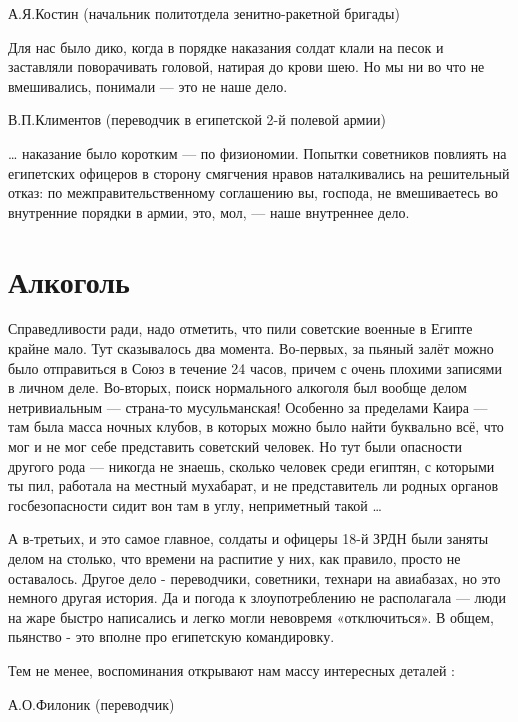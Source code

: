 А.Я.Костин (начальник политотдела зенитно-ракетной бригады)

\begin{textcitation}
	Для нас было дико, когда в порядке наказания солдат клали на песок и заставляли поворачивать головой, натирая до крови шею. Но мы ни во что не вмешивались, понимали — это не наше дело.
\end{textcitation}

В.П.Климентов (переводчик в египетской 2-й полевой армии)

\begin{textcitation}
	… наказание было коротким — по физиономии. Попытки советников повлиять на египетских офицеров в сторону смягчения нравов наталкивались на решительный отказ: по межправительственному соглашению вы, господа, не вмешиваетесь во внутренние порядки в армии, это, мол, — наше внутреннее дело.
\end{textcitation}

\section{Алкоголь}

Справедливости ради, надо отметить, что пили советские военные в Египте крайне мало. Тут сказывалось два момента. Во-первых, за пьяный залёт можно было отправиться в Союз в течение 24 часов, причем с очень плохими записями в личном деле. Во-вторых, поиск нормального алкоголя был вообще делом нетривиальным — страна-то мусульманская! Особенно за пределами Каира — там была масса ночных клубов, в которых можно было найти буквально всё, что мог и не мог себе представить советский человек. Но тут были опасности другого рода — никогда не знаешь, сколько человек среди египтян, с которыми ты пил, работала на местный мухабарат, и не представитель ли родных органов госбезопасности сидит вон там в углу, неприметный такой …

А в-третьих, и это самое главное, солдаты и офицеры 18-й ЗРДН были заняты делом на столько, что времени на распитие у них, как правило, просто не оставалось. Другое дело - переводчики, советники, технари на авиабазах, но это немного другая история. Да и погода к злоупотреблению не располагала — люди на жаре быстро написались и легко могли невовремя «отключиться». В общем, пьянство - это вполне про египетскую командировку.

Тем не менее, воспоминания открывают нам массу интересных деталей :

А.О.Филоник (переводчик)

